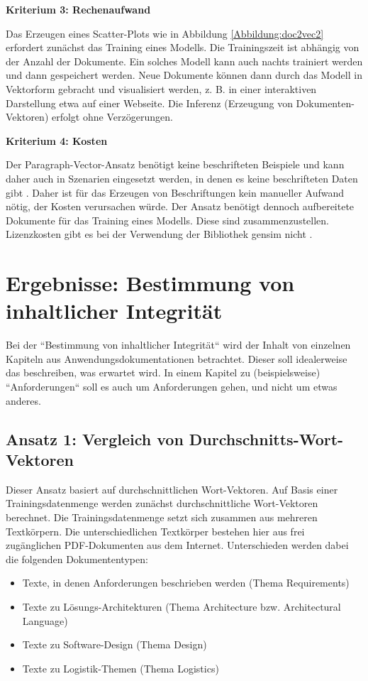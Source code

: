 
{\bf Kriterium 3: Rechenaufwand}

Das Erzeugen eines Scatter-Plots wie in Abbildung \ref{Abbildung:doc2vec2} erfordert zunächst das Training eines Modells. Die Trainingszeit ist abhängig von der Anzahl der Dokumente. Ein solches Modell kann auch nachts trainiert werden und dann gespeichert werden. Neue Dokumente können dann durch das Modell in Vektorform gebracht und visualisiert werden, z. B. in einer interaktiven Darstellung etwa auf einer Webseite. Die Inferenz (Erzeugung von Dokumenten-Vektoren) erfolgt ohne Verzögerungen.

{\bf Kriterium 4: Kosten}

Der Paragraph-Vector-Ansatz benötigt keine beschrifteten Beispiele und kann daher auch in Szenarien eingesetzt werden, in denen es keine beschrifteten Daten gibt \cite[S. 4]{mikolov2014}. Daher ist für das Erzeugen von Beschriftungen kein manueller Aufwand nötig, der Kosten verursachen würde. Der Ansatz benötigt dennoch aufbereitete Dokumente für das Training eines Modells. Diese sind zusammenzustellen. Lizenzkosten gibt es bei der Verwendung der Bibliothek gensim nicht \cite{gensim-license}.

\section{Ergebnisse: Bestimmung von inhaltlicher Integrität}

Bei der ``Bestimmung von inhaltlicher Integrität`` wird der Inhalt von einzelnen Kapiteln aus Anwendungsdokumentationen betrachtet. Dieser soll idealerweise das beschreiben, was erwartet wird. In einem Kapitel zu (beispielsweise) ``Anforderungen`` soll es auch um Anforderungen gehen, und nicht um etwas anderes.

\subsection{Ansatz 1: Vergleich von Durchschnitts-Wort-Vektoren}

Dieser Ansatz basiert auf durchschnittlichen Wort-Vektoren. Auf Basis einer Trainingsdatenmenge werden zunächst durchschnittliche Wort-Vektoren berechnet. Die Trainingsdatenmenge setzt sich zusammen aus mehreren Textkörpern. Die unterschiedlichen Textkörper bestehen hier aus frei zugänglichen PDF-Dokumenten aus dem Internet. Unterschieden werden dabei die folgenden Dokumententypen:

\begin{itemize}
\item Texte, in denen Anforderungen beschrieben werden (Thema Requirements)
\item Texte zu Lösungs-Architekturen (Thema Architecture bzw. Architectural Language)
\item Texte zu Software-Design (Thema Design) 
\item Texte zu Logistik-Themen (Thema Logistics)
\end{itemize}

